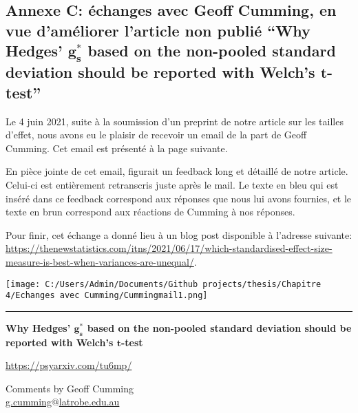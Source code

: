 \documentclass[
  12pt,
  french,
]{article}
\begin{document}
\newpage

\hypertarget{annexe-c-uxe9changes-avec-geoff-cumming-en-vue-damuxe9liorer-larticle-non-publiuxe9-why-hedges-bmg_s-based-on-the-non-pooled-standard-deviation-should-be-reported-with-welchs-bmt-test}{%
\subsection{\texorpdfstring{Annexe C: échanges avec Geoff Cumming, en
vue d'améliorer l'article non publié ``Why Hedges' \(\bm{g_s^*}\) based
on the non-pooled standard deviation should be reported with Welch's
\(\bm{t}\)-test''}{Annexe C: échanges avec Geoff Cumming, en vue d'améliorer l'article non publié ``Why Hedges' \textbackslash bm\{g\_s\^{}*\} based on the non-pooled standard deviation should be reported with Welch's \textbackslash bm\{t\}-test''}}\label{annexe-c-uxe9changes-avec-geoff-cumming-en-vue-damuxe9liorer-larticle-non-publiuxe9-why-hedges-bmg_s-based-on-the-non-pooled-standard-deviation-should-be-reported-with-welchs-bmt-test}}

Le 4 juin 2021, suite à la soumission d'un preprint de notre article sur
les tailles d'effet, nous avons eu le plaisir de recevoir un email de la
part de Geoff Cumming. Cet email est présenté à la page suivante.

En pièce jointe de cet email, figurait un feedback long et détaillé de
notre article. Celui-ci est entièrement retranscris juste après le mail.
Le texte en bleu qui est inséré dans ce feedback correspond aux réponses
que nous lui avons fournies, et le texte en brun correspond aux
réactions de Cumming à nos réponses.

Pour finir, cet échange a donné lieu à un blog post disponible à
l'adresse suivante:
\url{https://thenewstatistics.com/itns/2021/06/17/which-standardised-effect-size-measure-is-best-when-variances-are-unequal/}.

\texttt{[image: C:/Users/Admin/Documents/Github projects/thesis/Chapitre 4/Echanges avec Cumming/Cummingmail1.png]}
\newpage

\begin{center}\rule{0.5\linewidth}{0.5pt}\end{center}

\color{black}\textbf{Why Hedges' \(\bm{g_s^*}\) based on the non-pooled
standard deviation should be reported with Welch's \(\bm{t}\)-test}

\underline{https://psyarxiv.com/tu6mp/}

Comments by Geoff Cumming\\
\underline{g.cumming$@$latrobe.edu.au}
\end{document}
